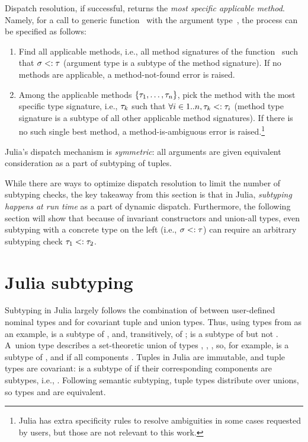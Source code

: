 Dispatch resolution, if successful, returns the \emph{most specific applicable
method}. Namely, for a call to generic function~ with the argument
type~\gty, the process can be specified as follows:
\begin{enumerate}
  \item Find all applicable methods, i.e., all method signatures \ty of the
    function~ such that $\sigma <: \tau$ (argument type is a subtype of the
    method signature).
    If no methods are applicable, a method-not-found error is raised.
  \item Among the applicable methods $\{\tau_1, \ldots, \tau_n\}$,
    pick the method with the most specific type signature,
    i.e., $\tau_k$ such that $\forall i\in1..n, \tau_k <: \tau_i$ 
    (method type signature is a subtype of all other applicable method
    signatures). If there is no such single best method, a method-is-ambiguous
    error is raised.\footnote{Julia has extra specificity rules
    to resolve ambiguities in some cases requested by users,
    but those are not relevant to this work.}
\end{enumerate}
Julia's dispatch mechanism is \emph{symmetric}: all arguments are given
equivalent consideration as a part of subtyping of tuples.

While there are ways to optimize dispatch resolution to limit the number of
subtyping checks, the key takeaway from this section is that
in Julia, \emph{subtyping happens at run time} as a part of dynamic dispatch.
Furthermore, the following section will show that because of invariant
constructors and union-all types, even subtyping with a concrete type on the left
(i.e., $\sigma <: \tau$) can require an arbitrary subtyping check $\tau_1 <: \tau_2$.

\section{Julia subtyping}\label{sec:2:subtyping}

Subtyping in Julia largely follows the combination of
 between user-defined nominal types and
 for covariant tuple and union types.
Thus, using types from  as an example,
 is a subtype of , and, transitively, of ;
 is a subtype of  but not
.
A~union type  describes a set-theoretic union of
types , , , so, for example,  is a subtype of
, and  if all
components .
Tuples in Julia are immutable, and tuple types are covariant:
 is a subtype of  if
their corresponding components are subtypes, i.e., .
Following semantic subtyping, tuple types distribute over unions,
so types  and
 are equivalent.

